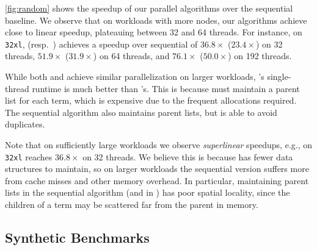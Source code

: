 
\autoref{fig:random} shows the speedup of our parallel algorithms over the
sequential baseline. We observe that on workloads with more nodes, our
algorithms achieve close to linear speedup, plateauing between 32 and 64
threads. For instance, on \texttt{32xl}, \filteralgo (resp.\ \parentalgo)
achieves a speedup over sequential of $36.8\times$ ($23.4\times$) on 32
threads, $51.9\times$ ($31.9\times$) on 64 threads, and $76.1\times$
($50.0\times$) on 192 threads.

While both \parentalgo and \filteralgo achieve similar parallelization on
larger workloads, \filteralgo's single-thread runtime is much better than
\parentalgo's. This is because \parentalgo must maintain a parent list for
each term, which is expensive due to the frequent allocations required.
The sequential algorithm also maintains parent lists, but is able to avoid
duplicates.


Note that on sufficiently large workloads we observe \emph{superlinear}
speedups, e.g., \filteralgo on \texttt{32xl} reaches $36.8\times$ on 32
threads. We believe this is because \filteralgo has fewer data structures
to maintain, so on larger workloads the sequential version suffers more
from cache misses and other memory overhead. In particular, maintaining
parent lists in the sequential algorithm (and in \parentalgo) has poor
spatial locality, since the children of a term may be scattered far from
the parent in memory.




\subsection{Synthetic Benchmarks}~\label{sec:eval:synthetic}

